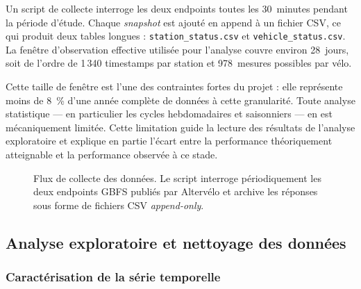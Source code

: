 \documentclass[fleqn, 12pt]{scrartcl}
\newcommand{\ent}{Altervélo\xspace}
\begin{document}
\vspace{0.3cm}

Un script de collecte interroge les deux endpoints toutes les 30~minutes pendant la période d'étude. Chaque \textit{snapshot} est ajouté en append à un fichier CSV, ce qui produit deux tables longues : \texttt{station\_status.csv} et \texttt{vehicle\_status.csv}.
%
La fenêtre d'observation effective utilisée pour l'analyse couvre environ 28~jours, soit de l'ordre de 1\,340 timestamps par station et 978~mesures possibles par vélo.

\vspace{0.3cm}

Cette taille de fenêtre est l'une des contraintes fortes du projet : elle représente moins de 8~\% d'une année complète de données à cette granularité. Toute analyse statistique --- en particulier les cycles hebdomadaires et saisonniers --- en est mécaniquement limitée. Cette limitation guide la lecture des résultats de l'analyse exploratoire et explique en partie l'écart entre la performance théoriquement atteignable et la performance observée à ce stade.

\begin{figure}[htp]
    \caption{Flux de collecte des données. Le script interroge périodiquement les deux endpoints GBFS publiés par \ent et archive les réponses sous forme de fichiers CSV \textit{append-only}.}
    \label{fig:collecte}
\end{figure}


\subsection{Analyse exploratoire et nettoyage des données}
\label{ssec:explo}


\subsubsection*{Caractérisation de la série temporelle}
\end{document}
